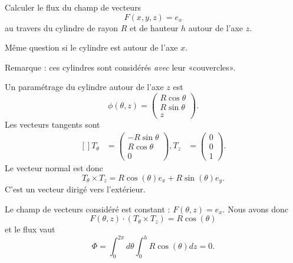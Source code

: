 \begin{example}     \label{EXooAJRLooSTPChN}

	Calculer le flux du champ de vecteurs
	\begin{equation}
		F(x,y,z)=e_x
	\end{equation}
	au travers du cylindre de rayon \( R\) et de hauteur \( h\) autour de l'axe \( z\).

	Même question si le cylindre est autour de l'axe \( x\).

	Remarque : ces cylindres sont considérés \emph{avec} leur «couvercles».


	Un paramétrage du cylindre autour de l'axe \( z\) est
	\begin{equation}
		\phi(\theta,z)=\begin{pmatrix}
			R\cos\theta \\
			R\sin\theta \\
			z
		\end{pmatrix}.
	\end{equation}
	Les vecteurs tangents sont
	\begin{equation}
		\begin{aligned}[]
			T_{\theta} & =\begin{pmatrix}
				              -R\sin\theta \\
				              R\cos\theta  \\
				              0
			              \end{pmatrix},
			T_z        & =\begin{pmatrix}
				              0 \\
				              0 \\
				              1
			              \end{pmatrix}.
		\end{aligned}
	\end{equation}
	Le vecteur normal est donc
	\begin{equation}
		T_{\theta}\times T_z=R\cos(\theta)e_x+R\sin(\theta)e_y.
	\end{equation}
	C'est un vecteur dirigé vers l'extérieur.

	Le champ de vecteurs considéré est constant : \( F(\theta,z)=e_x\). Nous avons donc
	\begin{equation}
		F(\theta,z)\cdot(T_{\theta}\times T_z)=R\cos(\theta)
	\end{equation}
	et le flux vaut
	\begin{equation}
		\Phi=\int_0^{2\pi}d\theta\int_0^hR\cos(\theta)dz=0.
	\end{equation}


\end{example}
